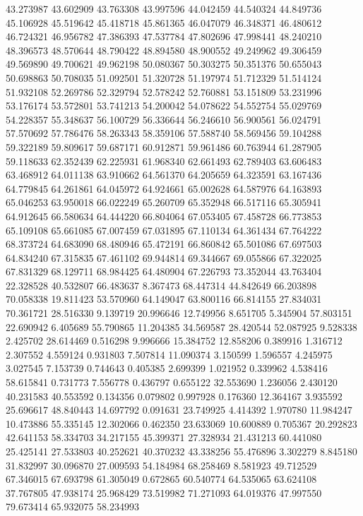 43.273987
43.602909
43.763308
43.997596
44.042459
44.540324
44.849736
45.106928
45.519642
45.418718
45.861365
46.047079
46.348371
46.480612
46.724321
46.956782
47.386393
47.537784
47.802696
47.998441
48.240210
48.396573
48.570644
48.790422
48.894580
48.900552
49.249962
49.306459
49.569890
49.700621
49.962198
50.080367
50.303275
50.351376
50.655043
50.698863
50.708035
51.092501
51.320728
51.197974
51.712329
51.514124
51.932108
52.269786
52.329794
52.578242
52.760881
53.151809
53.231996
53.176174
53.572801
53.741213
54.200042
54.078622
54.552754
55.029769
54.228357
55.348637
56.100729
56.336644
56.246610
56.900561
56.024791
57.570692
57.786476
58.263343
58.359106
57.588740
58.569456
59.104288
59.322189
59.809617
59.687171
60.912871
59.961486
60.763944
61.287905
59.118633
62.352439
62.225931
61.968340
62.661493
62.789403
63.606483
63.468912
64.011138
63.910662
64.561370
64.205659
64.323591
63.167436
64.779845
64.261861
64.045972
64.924661
65.002628
64.587976
64.163893
65.046253
63.950018
66.022249
65.260709
65.352948
66.517116
65.305941
64.912645
66.580634
64.444220
66.804064
67.053405
67.458728
66.773853
65.109108
65.661085
67.007459
67.031895
67.110134
64.361434
67.764222
68.373724
64.683090
68.480946
65.472191
66.860842
65.501086
67.697503
64.834240
67.315835
67.461102
69.944814
69.344667
69.055866
67.322025
67.831329
68.129711
68.984425
64.480904
67.226793
73.352044
43.763404
22.328528
40.532807
66.483637
8.367473
68.447314
44.842649
66.203898
70.058338
19.811423
53.570960
64.149047
63.800116
66.814155
27.834031
70.361721
28.516330
9.139719
20.996646
12.749956
8.651705
5.345904
57.803151
22.690942
6.405689
55.790865
11.204385
34.569587
28.420544
52.087925
9.528338
2.425702
28.614469
0.516298
9.996666
15.384752
12.858206
0.389916
1.316712
2.307552
4.559124
0.931803
7.507814
11.090374
3.150599
1.596557
4.245975
3.027545
7.153739
0.744643
0.405385
2.699399
1.021952
0.339962
4.538416
58.615841
0.731773
7.556778
0.436797
0.655122
32.553690
1.236056
2.430120
40.231583
40.553592
0.134356
0.079802
0.997928
0.176360
12.364167
3.935592
25.696617
48.840443
14.697792
0.091631
23.749925
4.414392
1.970780
11.984247
10.473886
55.335145
12.302066
0.462350
23.633069
10.600889
0.705367
20.292823
42.641153
58.334703
34.217155
45.399371
27.328934
21.431213
60.441080
25.425141
27.533803
40.252621
40.370232
43.338256
55.476896
3.302279
8.845180
31.832997
30.096870
27.009593
54.184984
68.258469
8.581923
49.712529
67.346015
67.693798
61.305049
0.672865
60.540774
64.535065
63.624108
37.767805
47.938174
25.968429
73.519982
71.271093
64.019376
47.997550
79.673414
65.932075
58.234993
